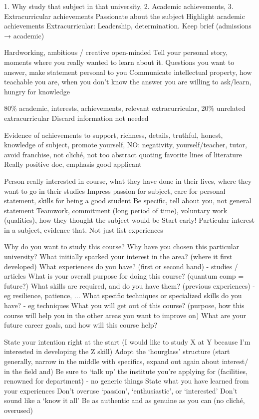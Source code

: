 \documentclass[11pt]{article}
\newcommand*{\NEWLINE}{\vspace{0.75em}}
\begin{document}
1. Why study that subject in that university, 2. Academic achievements, 3. Extracurricular achievements
Passionate about the subject
Highlight academic achievements
Extracurricular: Leadership, determination. Keep brief (admissions → academic)
\NEWLINE{}

Hardworking, ambitious / creative open-minded
Tell your personal story, moments where you really wanted to learn about it. Questions you want to answer, make statement personal to you
Communicate intellectual property, how teachable you are, when you don’t know the answer you are willing to ask/learn, hungry for knowledge
\NEWLINE{}

80\% academic, interests, achievements, relevant extracurricular, 20\% unrelated extracurricular
Discard information not needed
\NEWLINE{}

Evidence of achievements to support, richness, details, truthful, honest, knowledge of subject, promote yourself, 
NO: negativity, yourself/teacher, tutor, avoid franchise, not cliché, not too abstract quoting favorite lines of literature
Really positive doc, emphasis good applicant
\NEWLINE{}

Person really interested in course, what they have done in their lives, where they want to go in their studies
Impress passion for subject, care for personal statement, skills for being a good student
Be specific, tell about you, not general statement
Teamwork, commitment (long period of time), voluntary work (qualities), how they thought the subject would be
Start early! Particular interest in a subject, evidence that. Not just list experiences
\NEWLINE{}

Why do you want to study this course?
Why have you chosen this particular university?
What initially sparked your interest in the area? (where it first developed)
What experiences do you have? (first or second hand) - studies / articles
What is your overall purpose for doing this course? (quantum comp = future?)
What skills are required, and do you have them? (previous experiences) - eg resilience, patience, ...
What specific techniques or specialized skills do you have? - eg techniques
What you will get out of this course? (purpose, how this course will help you in the other areas you want to improve on)
What are your future career goals, and how will this course help?
\NEWLINE{}

State your intention right at the start (I would like to study X at Y because I’m interested in developing the Z skill)
Adopt the ‘hourglass’ structure (start generally, narrow in the middle with specifics, expand out again about interest/ in the field and)
Be sure to ‘talk up’ the institute you’re applying for (facilities, renowned for department) - no generic things
State what you have learned from your experiences
Don’t overuse ‘passion’, ‘enthusiastic’, or ‘interested’
Don’t sound like a ‘know it all’
Be as authentic and as genuine as you can (no cliché, overused)
\NEWLINE{}
\end{document}
